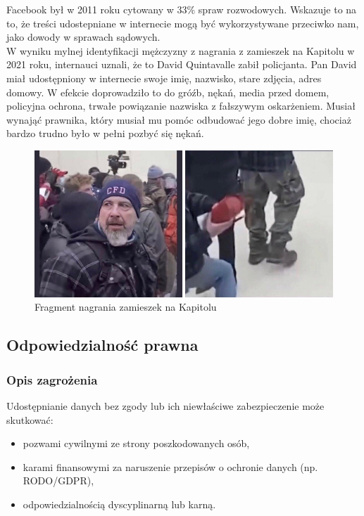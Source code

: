 Facebook był w 2011 roku cytowany w 33\% spraw rozwodowych. Wskazuje to na to, że treści udostepniane w internecie mogą być wykorzystywane przeciwko nam, jako dowody w sprawach sądowych.\\

W wyniku mylnej identyfikacji mężczyzny z nagrania z zamieszek na Kapitolu w 2021 roku, internauci uznali, że to David Quintavalle zabił policjanta. Pan David miał udostępniony w internecie swoje imię, nazwisko, stare zdjęcia, adres domowy. W efekcie doprowadziło to do gróźb, nękań, media przed domem, policyjna ochrona, trwałe powiązanie nazwiska z fałszywym oskarżeniem. Musiał wynająć prawnika, który musiał mu pomóc odbudować jego dobre imię, chociaż bardzo trudno było w pełni pozbyć się nękań.

\begin{figure}
  \centering
  \includegraphics[width=1\textwidth]{images/david.jpg}
  \caption{Fragment nagrania zamieszek na Kapitolu}
  \label{fig:david}
\end{figure} 

\subsection{Odpowiedzialność prawna}
\subsubsection{Opis zagrożenia}
Udostępnianie danych bez zgody lub ich niewłaściwe zabezpieczenie może skutkować:
\begin{itemize}
\item pozwami cywilnymi ze strony poszkodowanych osób,
\item karami finansowymi za naruszenie przepisów o ochronie danych (np. RODO/GDPR),
\item odpowiedzialnością dyscyplinarną lub karną.
\end{itemize}

